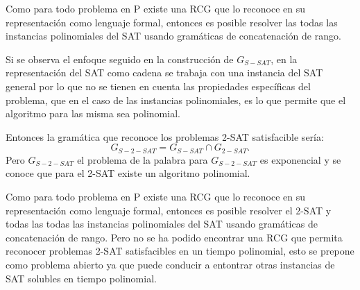 \documentclass[12pt]{article}
\begin{document}
Como para todo problema en P existe una RCG que lo reconoce en su representación como lenguaje formal,
entonces es posible resolver las todas las instancias polinomiales del SAT usando gramáticas de
concatenación de rango.

Si se observa el enfoque seguido en la construcción de $G_{S-SAT}$, en la representación del SAT como cadena se
trabaja con una instancia del SAT general por lo que no se tienen en cuenta las propiedades específicas
del problema, que en el caso de las instancias polinomiales, es lo que permite que el algoritmo para las
misma sea polinomial.

Entonces la gramática que reconoce los problemas 2-SAT satisfacible sería:
$$G_{S-2-SAT}=G_{S-SAT}\cap G_{2-SAT}.$$
Pero $G_{S-2-SAT}$ el problema de la palabra para $G_{S-2-SAT}$ es exponencial y se conoce que para el 2-SAT
existe un algoritmo polinomial.

Como para todo problema en P existe una RCG que lo reconoce en su representación como lenguaje formal,
entonces es posible resolver el 2-SAT y todas las todas las instancias polinomiales del SAT usando gramáticas de
concatenación de rango. Pero no se ha podido encontrar una RCG que permita reconocer problemas 2-SAT satisfacibles
en un tiempo polinomial, esto se prepone como problema abierto ya que puede conducir a entontrar otras instancias 
de SAT solubles en tiempo polinomial.




\end{document}

